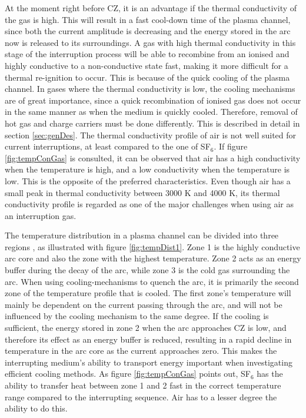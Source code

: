 \documentclass[10pt,b5paper,twoside]{article}
\begin{document}
At the moment right before CZ, it is an advantage if the thermal conductivity of the gas is high. This will result in a fast cool-down time of the plasma channel, since both the current amplitude is decreasing and the energy stored in the arc now is released to its surroundings. A gas with high thermal conductivity in this stage of the interruption process will be able to recombine from an ionised and highly conductive to a non-conductive state fast, making it more difficult for a thermal re-ignition to occur. This is because of the quick cooling of the plasma channel. In gases where the thermal conductivity is low, the cooling mechanisms are of great importance, since a quick recombination of ionised gas does not occur in the same manner as when the medium is quickly cooled. Therefore, removal of hot gas and charge carriers must be done differently. This is described in detail in section \ref{sec:genDes}. The thermal conductivity profile of air is not well suited for current interruptions, at least compared to the one of SF$_6$. If figure \ref{fig:tempConGas} is consulted, it can be observed that air has a high conductivity when the temperature is high, and a low conductivity when the temperature is low. This is the opposite of the preferred characteristics. Even though air has a small peak in thermal conductivity between 3000 K and 4000 K, its thermal conductivity profile is regarded as one of the major challenges when using air as an interruption gas. 

The temperature distribution in a plasma channel can be divided into three regions \cite{bib:TDCIGBB}, as illustrated with figure \ref{fig:tempDist1}. Zone 1 is the highly conductive arc core and also the zone with the highest temperature. Zone 2 acts as an energy buffer during the decay of the arc, while zone 3 is the cold gas surrounding the arc. When using cooling-mechanisms to quench the arc, it is primarily the second zone of the temperature profile that is cooled. The first zone's temperature will mainly be dependent on the current passing through the arc, and will not be influenced by the cooling mechanism to the same degree. If the cooling is sufficient, the energy stored in zone 2 when the arc approaches CZ is low, and therefore its effect as an energy buffer is reduced, resulting in a rapid decline in temperature in the arc core as the current approaches zero. This makes the interrupting medium's ability to transport energy important when investigating efficient cooling methods. As figure \ref{fig:tempConGas} points out, SF$_6$ has the ability to transfer heat between zone 1 and 2 fast in the correct temperature range compared to the interrupting sequence. Air has to a lesser degree the ability to do this.
\end{document}
